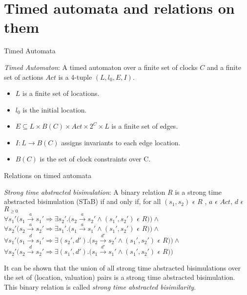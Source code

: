 \documentclass{beamer}
\begin{document}
\section{Timed automata and relations on them}

\begin{frame}{Timed Automata}
  \begin{definition}
    \emph{Timed Automaton}: A timed automaton
    \cite{Alur94atheory} over a finite set of clocks $C$
    and a finite set of actions $Act$ is a 4-tuple $(L, l_{0}, E, I)$.
    \begin{itemize}
    \item $L$ is a finite set of locations.
    \item $l_{0}$ is the initial location.
    \item $E \subseteq L \times B(C) \times Act \times 2^{C} \times L$
      is a finite set of edges.
    \item $I: L \rightarrow B(C)$ assigns invariants to each edge
      location.
    \item $B(C)$ is the set of clock constraints over C.
    \end{itemize}
  \end{definition}
\end{frame}

\begin{frame}{Relations on timed automata}
\begin{definition}  \label{def:stab} \emph{Strong time abstracted bisimulation}: A binary relation
  $R$ is a strong time abstracted bisimulation (STaB) if and only if, for all
  $(s_1, s_2)$ $\epsilon$ $R$ , $a$ $\epsilon$ $Act $, $d$ $\epsilon$ $R_{\ge 0}$\\
  $\forall s_1' (s_1 \xrightarrow{a} s_1' \Rightarrow \exists s_2'
  . (s_2 \xrightarrow{a} s_2' \wedge (s_1', s_2')$ $\epsilon$ $R ) )
  \wedge $ \\
  $\forall s_2' (s_2 \xrightarrow{a} s_2' \Rightarrow \exists s_1'
  . (s_1 \xrightarrow{a} s_1' \wedge (s_1', s_2')$ $\epsilon$ $R ) ) \wedge $ \\
  $\forall s_1' (s_1 \xrightarrow{d} s_1' \Rightarrow \exists (s_2',
  d')
  . (s_2 \xrightarrow{d'} s_2' \wedge (s_1', s_2')$ $\epsilon$ $R ) )
  \wedge $ \\
  $\forall s_2' (s_2 \xrightarrow{d} s_2' \Rightarrow \exists (s_1', d')
  . (s_1 \xrightarrow{d'} s_1' \wedge (s_1', s_2')$ $\epsilon$ $R ) ) $ \\
\end{definition}

It can be shown that the union of all strong time abstracted
  bisimulations over the set of (location, valuation) pairs is a
  strong time abstracted bisimulation. This binary relation is called
  \textit{strong time abstracted bisimilarity}.
\end{frame}
\end{document}
